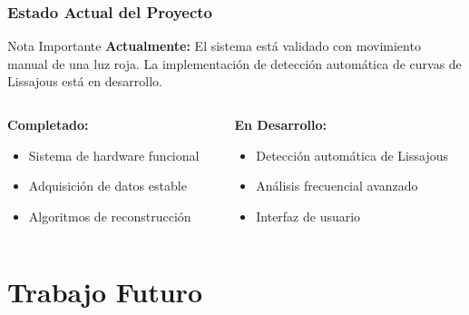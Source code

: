 \documentclass[xcolor=dvipsnames]{beamer}
\begin{document}
\begin{frame}
    \frametitle{Estado Actual del Proyecto}
    \begin{alertblock}{Nota Importante}
        \textbf{Actualmente:} El sistema está validado con movimiento manual de una luz roja. La implementación de detección automática de curvas de Lissajous está en desarrollo.
    \end{alertblock}
    
    \vspace{0.5cm}
    \begin{columns}
        \begin{column}{0.5\textwidth}
            \textbf{Completado:}
            \begin{itemize}
                \item Sistema de hardware funcional
                \item Adquisición de datos estable
                \item Algoritmos de reconstrucción
            \end{itemize}
        \end{column}
        \begin{column}{0.5\textwidth}
            \textbf{En Desarrollo:}
            \begin{itemize}
                \item Detección automática de Lissajous
                \item Análisis frecuencial avanzado
                \item Interfaz de usuario
            \end{itemize}
        \end{column}
    \end{columns}
\end{frame}

\section{Trabajo Futuro}
\end{document}
